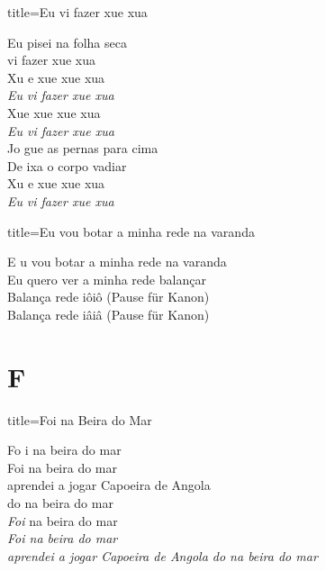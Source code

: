 \documentclass[fontsize=14pt, twoside]{scrreprt}
\newcommand\chapTOC[1]{
    \chapter*{#1}
    \addcontentsline{toc}{chapter}{#1}
    \markboth{#1}{#1}}
\begin{document}
\begin{multicols*}{2}
\begin{song}{title={Eu vi fazer xue xua }}
        \begin{verse*}
            Eu pisei na folha seca\\
            vi fazer xue xua\\
            Xu e xue xue xua\\
            \textit{Eu} \textit{vi fazer xue xua}\\
            Xue xue xue xua\\
            \textit{Eu vi fazer xue xua}\\
            Jo gue as pernas para cima\\
            De ixa o corpo vadiar\\
            Xu e xue xue xua\\
            \textit{Eu} \textit{vi fazer xue xua}\\
        \end{verse*}
\end{song}

\begin{song}{title={Eu vou botar a minha rede na varanda}}
        \begin{verse*}
            E u vou botar a minha rede na varanda\\
            Eu quero ver a minha rede balançar\\
            Balança rede iôiô (Pause für Kanon)\\
            Balança rede iâiâ (Pause für Kanon)\\
        \end{verse*}
\end{song}

\chapTOC{F}

\begin{song}{title={Foi na Beira do Mar}}
        \begin{verse*}
            Fo i na beira do mar\\
            Foi na beira do mar\\
            aprendei a jogar Capoeira de Angola\\
            do na beira do mar\\

            \textit{Foi} na beira do mar\\
             \textit{Foi na beira do mar\\}
            \textit{aprendei a jogar Capoeira de Angola do na beira do mar\\}
        \end{verse*}
\end{song}


\end{multicols*}
\end{document}
